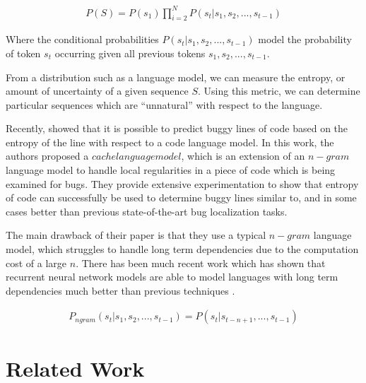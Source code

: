 \documentclass{article}
\begin{document}
\begin{align*}
P(S) = P(s_{1}) \prod_{i=2}^{N} P(s_t \vert s_1,s_2, ... , s_{t-1})
\end{align*}


Where the conditional probabilities $P(s_t \vert s_1,s_2, ... , s_{t-1})$ model the probability of token $s_t$ occurring given all previous tokens $s_1,s_2, ... , s_{t-1}$.

From a distribution such as a language model, we can measure the entropy, or amount of uncertainty of a given sequence $S$. Using this metric, we can determine particular sequences which are ``unnatural'' with respect to the language. 

Recently, \cite{ray2015naturalness} showed that it is possible to predict buggy lines of code based on the entropy of the line with respect to a code language model.  In this work, the authors proposed a $cache language model$, which is an extension of an $n-gram$ language model to handle local regularities in a piece of code which is being examined for bugs. They provide extensive experimentation to show that entropy of code can successfully be used to determine buggy lines similar to, and in some cases better than previous state-of-the-art bug localization tasks.

The main drawback of their paper is that they use a typical $n-gram$ language model, which struggles to handle long term dependencies due to the computation cost of a large $n$. There has been much recent work which has shown that recurrent neural network models are able to model languages with long term dependencies much better than previous techniques \cite{graves2013generating, sutskever2014sequence, sundermeyer2012lstm, karpathy2015visualizing}. 






\begin{align*}
P_{ngram}(s_t \vert s_1,s_2, ... , s_{t-1}) = P(s_t \vert s_{t-n+1},...,s_{t-1})
\end{align*}





\section{Related Work}
\end{document}
